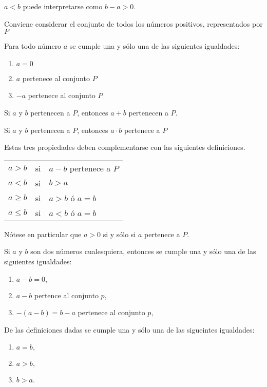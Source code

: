 \begin{def.}
$a<b$ puede interpretarse como $b-a>0$.
\end{def.}

Conviene considerar el conjunto de todos los números positivos, representados por $P$\\

\begin{prop} Para todo número $a$ se cumple una y sólo una de las siguientes igualdades:
\begin{enumerate}[\bfseries i)]
\item $a=0$
\item $a$ pertenece al conjunto $P$
\item $-a$ pertenece al conjunto $P$
\end{enumerate}
\end{prop}

\begin{prop} Si $a$ y $b$ pertenecen a $P$, entonces $a+b$ pertenecen a $P$.
\end{prop}

\begin{prop} Si $a$ y $b$ pertenecen a $P$, entonces $a\cdot b$ pertenece a $P$
\end{prop}

\begin{def.} Estas tres propiedades deben complementarse con las siguientes definiciones.
\begin{center}
\begin{tabular}{r c l}
$a>b$&si&$a-b$ pertenece a $P$\\
$a<b$&si&$b>a$\\
$a\geq b $&si&$a>b$ ó $a=b$\\
$a\leq b$&si&$a<b$ ó $a=b$\\
\end{tabular}
\end{center}
Nótese en particular que $a>0$ si y sólo si $a$ pertenece a $P$.
\end{def.}

\begin{def.}
Si $a$ y $b$ son dos números cualesquiera, entonces se cumple una y sólo una de las siguientes igualdades:
\begin{enumerate}[\bfseries i)]
\item $a-b=0,$
\item $a-b$ pertence al conjunto $p,$
\item $-(a-b) = b-a$ pertenece al conjunto $p,$
\end{enumerate}
De las definiciones dadas se cumple una y sólo una de las sigueintes igualdades:
\begin{enumerate}[\bfseries i)]
\item $a=b,$
\item  $a>b,$
\item $b>a.$
\end{enumerate}
\end{def.}

